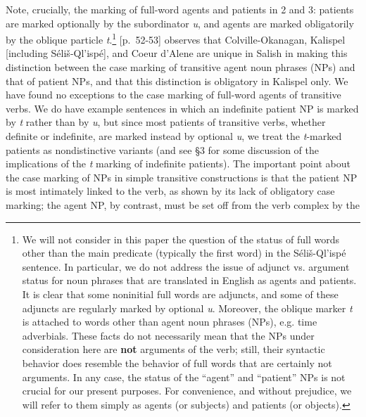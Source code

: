 \documentclass[output=paper,colorlinks,citecolor=brown]{langscibook}
\begin{document}
  Note, crucially, the marking of full-word agents and patients in 2
  and 3: patients are marked optionally by the subordinator
  \emph{{\textltilde}u}, and agents are marked obligatorily by the
  oblique particle \emph{t}.\footnote{We will not consider in this
  paper the question of the status of full words other than the main
  predicate (typically the first word) in the S\'eli\v{s}-Ql'isp\'e
  sentence.  In particular, we do not address the issue of adjunct
  vs. argument status for noun phrases that are translated in English
  as agents and patients.  It is clear that some noninitial full
  words are adjuncts, and some of these adjuncts are regularly marked
  by optional \emph{{\textltilde}u}.  Moreover, the oblique marker
  \emph{t} is attached to words other than agent noun phrases (NPs),
  e.g.  time adverbials.  These facts do not necessarily mean that
  the NPs under consideration here are \textbf{not} arguments of the
  verb; still, their syntactic behavior does resemble the behavior of
  full words that are certainly not arguments.  In any case, the
  status of the ``agent'' and ``patient'' NPs is not crucial for our
  present purposes.  For convenience, and without prejudice, we will
  refer to them simply as agents (or subjects) and patients (or
  objects).  } \cite{Kroeber:1999}[p.~52-53] observes that Colville-Okanagan,
  Kalispel [including S\'eli\v{s}-Ql'isp\'e], and Coeur d'Alene are
  unique in Salish in making this distinction between the case
  marking of transitive agent noun phrases (NPs) and that of patient
  NPs, and that this distinction is obligatory in Kalispel only.  We
  have found no exceptions to the case marking of full-word agents of
  transitive verbs.  We do have example sentences in which an
  indefinite patient NP is marked by \emph{t} rather than by \emph{{\textltilde}u}, but since most patients of transitive verbs,
  whether definite or indefinite, are marked instead by optional \emph{{\textltilde}u}, we treat the \emph{t}-marked patients as
  nondistinctive variants (and see \S 3 for some discussion of the
  implications of the \emph{t} marking of indefinite patients).  The
  important point about the case marking of NPs in simple transitive
  constructions is that the patient NP is most intimately linked to
  the verb, as shown by its lack of obligatory case marking; the
  agent NP, by contrast, must be set off from the verb complex by the
\end{document}
